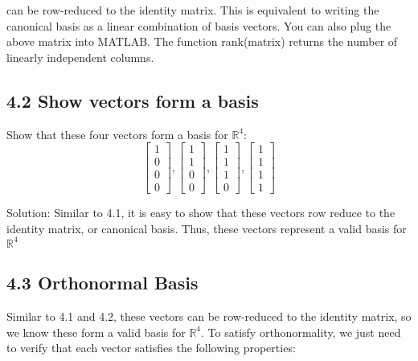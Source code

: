 \documentclass[11pt]{article}
\begin{document}
can be row-reduced to the identity matrix. This is equivalent to writing the canonical basis as a linear combination of basis vectors. You can also plug the above matrix into MATLAB. The function rank(matrix) returns the number of linearly independent columns. 

\subsection*{4.2 \hspace{3mm} Show vectors form a basis}
Show that these four vectors form a basis for $\mathbb{R}^4$:
\[
\begin{bmatrix}
   1        \\
    0      \\
   0       \\
    0      
\end{bmatrix}
,
\begin{bmatrix}
      1        \\
    1      \\
   0       \\
    0      
\end{bmatrix}
,
\begin{bmatrix}
   1        \\
    1     \\
   1    \\
    0      
\end{bmatrix}
,
\begin{bmatrix}
       1        \\
    1      \\
   1       \\
    1      
\end{bmatrix}
\]

\vspace{3mm}
Solution:\newline
Similar to 4.1, it is easy to show that these vectors row reduce to the identity matrix, or canonical basis. Thus, these vectors represent a valid basis for $\mathbb{R}^4$

\subsection*{4.3 \hspace{3mm} Orthonormal Basis}
Similar to 4.1 and 4.2, these vectors can be row-reduced to the identity matrix, so we know these form a valid basis for $\mathbb{R}^4$. To satisfy orthonormality, we just need to verify that each vector satisfies the following properties:
\end{document}
